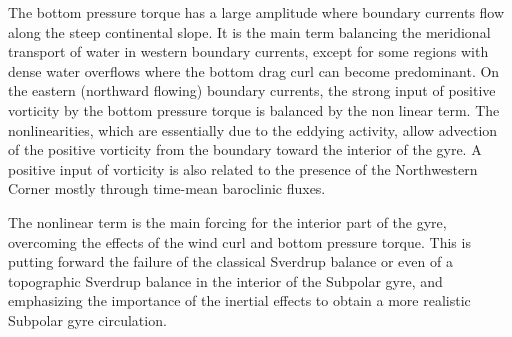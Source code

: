 \documentclass[os, manuscript]{copernicus}
\begin{document}
The bottom pressure torque has a large amplitude where boundary currents flow along the steep continental slope. It is the main term  balancing the meridional transport of water in western  boundary currents, except for some regions with dense water overflows where the bottom drag curl can become predominant. On the eastern (northward flowing) boundary currents, the strong input of positive vorticity by the bottom pressure torque is balanced by  the non linear term. The nonlinearities, which are essentially due to the eddying activity, allow advection of the positive vorticity from the boundary toward the interior of the gyre. A positive input of vorticity is also related to the presence of the Northwestern Corner mostly through time-mean baroclinic fluxes.

The nonlinear term is the main forcing for the interior part of the gyre, overcoming the effects of the wind curl and bottom pressure torque. This is putting forward the failure of the classical Sverdrup balance or even of a topographic Sverdrup balance in the interior of the Subpolar gyre, and emphasizing the importance of the inertial effects to obtain a more realistic Subpolar gyre circulation.




\end{document}
